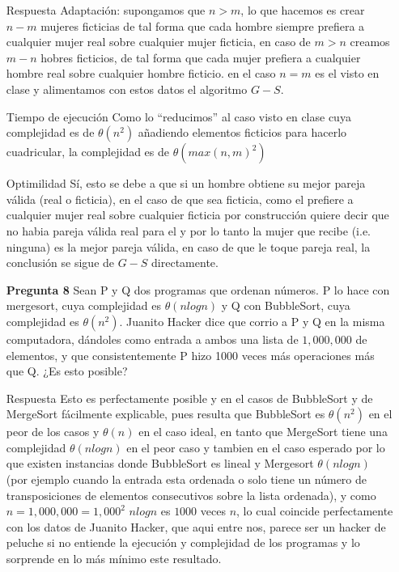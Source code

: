 \documentclass[12pt]{article}
\begin{document}
\begin{itemize}
\item[Respuesta] Adaptación: supongamos que $n > m$, lo que hacemos es crear $n-m$ mujeres ficticias de tal forma que cada hombre siempre prefiera a cualquier mujer real sobre cualquier mujer ficticia, en caso de $m > n$ creamos $m-n$ hobres ficticios, de tal forma que cada mujer prefiera a cualquier hombre real sobre cualquier hombre ficticio. en el caso $n = m$ es el visto en clase y alimentamos con estos datos el algoritmo $G-S$.
\item[Tiempo de ejecución] Como lo ``reducimos'' al caso visto en clase cuya complejidad es de $\theta(n^2)$ añadiendo elementos ficticios para hacerlo cuadricular, la complejidad es de  $\theta(max(n,m)^2)$

\item[Optimilidad] Sí, esto se debe a que si un hombre obtiene su mejor pareja válida (real o ficticia), en el caso de que sea ficticia, como el prefiere a cualquier mujer real sobre cualquier ficticia por construcción quiere decir que no habia pareja válida real para el y por lo tanto la mujer que recibe (i.e. ninguna) es la mejor pareja válida, en caso de que le toque pareja real, la conclusión se sigue de $G-S$ directamente.

\item[\bf{Pregunta 8}] Sean P y Q dos programas que ordenan números. P lo hace con mergesort, cuya complejidad es $\theta(n log n)$ y Q con BubbleSort, cuya complejidad es $\theta(n^2)$. Juanito Hacker dice que corrio a P y Q en la misma computadora, dándoles como entrada a ambos una lista de $1,000,000$ de elementos, y que consistentemente  P hizo 1000 veces más operaciones más que Q. ¿Es esto posible?

\item[Respuesta] Esto es perfectamente posible y en el casos de BubbleSort y de MergeSort fácilmente explicable, pues resulta que BubbleSort es $\theta(n^2)$ en el peor de los casos y $\theta(n)$ en el caso ideal, en tanto que MergeSort tiene una complejidad $\theta(n log n)$ en el peor caso y tambien en el caso esperado por lo que existen instancias donde BubbleSort es lineal y Mergesort $\theta(n log n)$ (por ejemplo cuando la entrada esta ordenada o solo tiene un número de transposiciones de elementos consecutivos sobre la lista ordenada), y como $n = 1,000,000 = 1,000^2$ $nlogn$ es $1000$ veces $n$, lo cual coincide perfectamente con los datos de Juanito Hacker, que aqui entre nos, parece ser un hacker de peluche si no entiende la ejecución y complejidad de los programas y lo sorprende en lo más mínimo este resultado.


\end{itemize}
\end{document}

